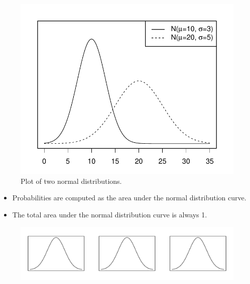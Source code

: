 \documentclass{beamer}
\begin{document}
\begin{frame}
\begin{figure}
\includegraphics[scale=0.65]{figure/norm2.pdf}
\caption{Plot of two normal distributions.}
\end{figure}
\end{frame}

\begin{frame}
\begin{itemize}
\item Probabilities are computed as the area under the normal distribution curve.
\vspace{5pt}
\item The total area under the normal distribution curve is always 1.
\end{itemize}
\begin{figure}
\includegraphics[scale=0.55]{figure/norm3}
\end{figure}
\end{frame}
\end{document}
